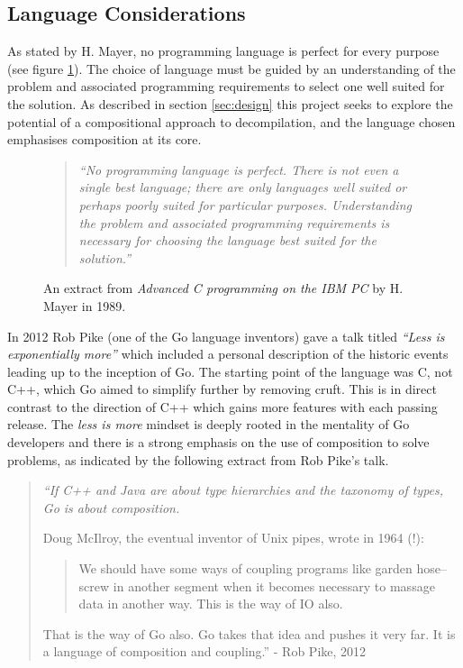 

\subsection{Language Considerations}

As stated by H. Mayer, no programming language is perfect for every purpose (see figure \ref{fig:no_perfect_lang}). The choice of language must be guided by an understanding of the problem and associated programming requirements to select one well suited for the solution. As described in section \ref{sec:design} this project seeks to explore the potential of a compositional approach to decompilation, and the language chosen emphasises composition at its core.

\begin{figure}[htbp]
	\begin{quote}
		\textit{``No programming language is perfect. There is not even a single best language; there are only languages well suited or perhaps poorly suited for particular purposes. Understanding the problem and associated programming requirements is necessary for choosing the language best suited for the solution.''} \cite{no_perfect_lang_quote}
	\end{quote}
	\caption{An extract from \textit{Advanced C programming on the IBM PC} by H. Mayer in 1989.}
	\label{fig:no_perfect_lang}
\end{figure}

In 2012 Rob Pike (one of the Go language inventors) gave a talk titled \textit{``Less is exponentially more''} which included a personal description of the historic events leading up to the inception of Go. The starting point of the language was C, not C++, which Go aimed to simplify further by removing cruft. This is in direct contrast to the direction of C++ which gains more features with each passing release. The \textit{less is more} mindset is deeply rooted in the mentality of Go developers and there is a strong emphasis on the use of composition to solve problems, as indicated by the following extract from Rob Pike's talk.

\begin{quote}
	\itshape
	``If C++ and Java are about type hierarchies and the taxonomy of types, Go is about composition.

	Doug McIlroy, the eventual inventor of Unix pipes, wrote in 1964 (!):

	\begin{quote}
		We should have some ways of coupling programs like garden hose--screw in another segment when it becomes necessary to massage data in another way. This is the way of IO also.
	\end{quote}

	That is the way of Go also. Go takes that idea and pushes it very far. It is a language of composition and coupling.''
	\normalfont
	- Rob Pike, 2012 \cite{less_is_more}
\end{quote}

